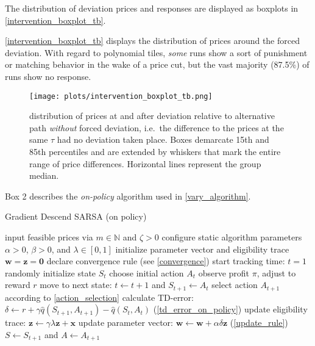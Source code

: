 The distribution of deviation prices and responses are displayed as boxplots in \autoref{intervention_boxplot_tb}.

\autoref{intervention_boxplot_tb} displays the distribution of prices around the forced deviation. With regard to polynomial tiles, \emph{some} runs show a sort of punishment or matching behavior in the wake of a price cut, but the vast majority (87.5\%) of runs show no response.

\begin{figure}
	\texttt{[image: plots/intervention\_boxplot\_tb.png]}
	\caption{distribution of prices at and after deviation relative to alternative path \emph{without} forced deviation, i.e.\ the difference to the prices at the same $\tau$ had no deviation taken place. Boxes demarcate 15th and 85th percentiles and are extended by whiskers that mark the entire range of price differences. Horizontal lines represent the group median.}
	\label{intervention_boxplot_tb}
\end{figure}


\pagebreak

Box 2 describes the \emph{on-policy} algorithm used in \autoref{vary_algorithm}.

\begin{algorithm}
	\caption{Gradient Descend SARSA (on policy)}
	\begin{algorithmic}[]
		\label{SARSA}
		\small
		\STATE input feasible prices via $m \in \mathbb{N}$ and $\zeta > 0$
		\STATE configure static algorithm parameters $\alpha > 0$, $\beta > 0$, and $\lambda \in [0, 1]$
		\STATE initialize parameter vector and eligibility trace $\boldsymbol{w} = \boldsymbol{z} = \boldsymbol{0}$
		\STATE declare convergence rule (see \autoref{convergence})
		\STATE start tracking time: $t = 1$
		\STATE randomly initialize state $S_t$
		\STATE choose initial action $A_t$
		\STATE observe profit $\pi$, adjust to reward $r$
		\STATE move to next state: $t \leftarrow t+1$ and $S_{t+1} \leftarrow A_t$
		\STATE select action $A_{t+1}$ according to \autoref{action_selection}
		\STATE calculate TD-error: $\delta \leftarrow r + \gamma \hat{q}(S_{t+1}, A_{t+1}) - \hat{q}(S_t, A_t)$ (\autoref{td_error_on_policy})
		\STATE update eligibility trace: $\boldsymbol{z} \leftarrow \gamma \lambda \boldsymbol{z} + \boldsymbol{x}$
		\STATE update parameter vector: $\boldsymbol{w} \leftarrow \boldsymbol{w} + \alpha  \delta  \boldsymbol{z}$ (\autoref{update_rule})
		\STATE $S \leftarrow S_{t+1}$ and $A \leftarrow A_{t+1}$
		\ENDWHILE
	\end{algorithmic}
\end{algorithm}




